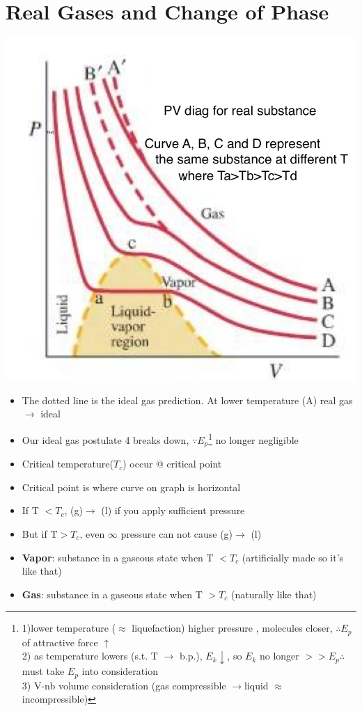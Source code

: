 \documentclass[12 pt, twoside, a4paper] {article}
\begin{document}
\section{Real Gases and Change of Phase}
\includegraphics[scale=0.2]{RealGasPVDiagram2}
\begin{itemize}
\item The dotted line is the ideal gas prediction. At lower temperature (A) real gas $\rightarrow$ ideal
\item Our ideal gas postulate 4 breaks down, $\because E_p $\footnote{1)lower temperature ($\approx$ liquefaction) higher pressure , molecules closer, $\therefore E_p $of attractive force $\uparrow$ \\2) as temperature lowers (s.t. T $\rightarrow$ b.p.), $E_k \downarrow$, so $E_k$ no longer $>> E_p \therefore$ must take $E_p$ into consideration \\3) V-nb volume consideration (gas compressible $\rightarrow$liquid $\approx$ incompressible)} no longer negligible
\item Critical temperature($T_c$) occur @ critical point
\item Critical point is where curve on graph is horizontal
\item If T $< T_c$, (g)$\rightarrow$ (l) if you apply sufficient pressure
\item But if T$> T_c$, even $\infty$ pressure can not cause (g)$\rightarrow$ (l)
\item \textbf{Vapor}: substance in a gaseous state when  T $< T_c$ (artificially made so it's like that)
\item \textbf{Gas}: substance in a gaseous state when T  $>T_c$ (naturally like that)
\end{itemize}
\end{document}
